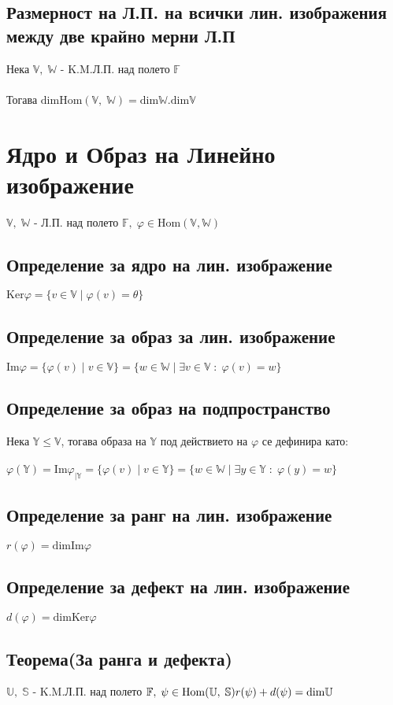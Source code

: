 \documentclass{article}
\newcommand{\V}{\mathbb{V}}
\newcommand{\F}{\mathbb{F}}
\newcommand{\W}{\mathbb{W}}
\newcommand{\UV}{\mathbb{U}}
\newcommand{\OV}{\theta}
\begin{document}
    \subsection{Размерност на Л.П. на всички лин. изображения между две крайно мерни Л.П}
    Нека \(\V, \; \W\) - K.M.Л.П. над полето \(\F\) \\\\
    Тогава \(\mathrm{dim}\mathrm{Hom}(\V, \; \W) = \mathrm{dim}\W . \mathrm{dim}\V\)
    \section{Ядро и Образ на Линейно изображение}
    \(\V, \; \W\) - Л.П. над полето \(\F, \; \varphi \in \mathrm{Hom}(\V, \W)\)
    \subsection{Определение за ядро на лин. изображение}
    \(\mathrm{Ker} \varphi = \{v \in \V \; | \; \varphi(v) =\OV\}\)
    \subsection{Определение за образ за лин. изображение}
    \(\mathrm{Im} \varphi = \{\varphi(v) \; | \; v \in \V\} = \{w \in \W \; | \; \exists v \in \V \; : \; \varphi(v) = w \}\)
    \subsection{Определение за образ на подпространство}
    Нека \(\mathbb{Y} \leq \V\), тогава образа на \(\mathbb{Y}\) под действието на \(\varphi\) се дефинира като: \\\\
    \(\varphi(\mathbb{Y}) = \mathrm{Im}\varphi_{|\mathbb{Y}}
    = \{\varphi(v) \; | \; v \in \mathbb{Y}\} = \{w \in \W \; | \; \exists y \in \mathbb{Y} \; : \; \varphi(y) = w \}\)
    \subsection{Определение за ранг на лин. изображение}
    \(r(\varphi) = \mathrm{dim}\mathrm{Im}\varphi\)
    \subsection{Определение за дефект на лин. изображение}
    \(d(\varphi) = \mathrm{dim}\mathrm{Ker}\varphi\)
    \subsection{Теорема(За ранга и дефекта)}
    \(\UV, \; \mathbb{S}\) - K.M.Л.П. над полето \(\F, \; \psi \in \mathrm{Hom}(\UV, \; \mathbb{S}) \\\\
    r(\psi) + d(\psi) = \mathrm{dim}\UV\)
\end{document}
